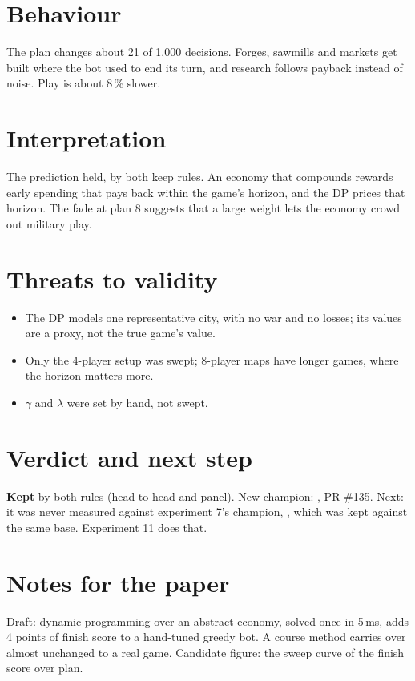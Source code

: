 \documentclass{../polyexp}
\begin{document}
\section{Behaviour}
The plan changes about 21 of 1,000 decisions. Forges, sawmills and markets get built where the bot used to end its turn, and research follows payback instead of noise. Play is about 8\,\% slower.


\section{Interpretation}
The prediction held, by both keep rules. An economy that compounds rewards early spending that pays back within the game's horizon, and the DP prices that horizon. The fade at plan 8 suggests that a large weight lets the economy crowd out military play.


\section{Threats to validity}
\begin{itemize}
\item The DP models one representative city, with no war and no losses; its values are a proxy, not the true game's value.
\item Only the 4-player setup was swept; 8-player maps have longer games, where the horizon matters more.
\item $\gamma$ and $\lambda$ were set by hand, not swept.
\end{itemize}

\section{Verdict and next step}
\textbf{Kept} by both rules (head-to-head and panel). New champion: , PR \#135. Next: it was never measured against experiment 7's champion, , which was kept against the same base. Experiment 11 does that.

\section{Notes for the paper}
Draft: dynamic programming over an abstract economy, solved once in 5\,ms, adds 4 points of finish score to a hand-tuned greedy bot. A course method carries over almost unchanged to a real game. Candidate figure: the sweep curve of the finish score over plan.

\end{document}
